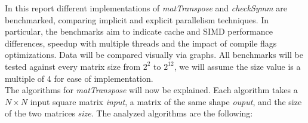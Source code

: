 \documentclass[conference]{IEEEtran}
\begin{document}

In this report different implementations of \textit{matTranspose}
and \textit{checkSymm} are benchmarked, comparing implicit and explicit parallelism
techniques. In particular, the benchmarks aim to indicate cache and SIMD performance differences,
speedup with multiple threads and the impact of compile flags optimizations. Data will be compared visually via graphs. All benchmarks
will be tested against every matrix size from $2^2$ to $2^{12}$, we will assume the size value is a multiple of 4 for ease of implementation.  \\
The algorithms for \textit{matTranspose} will now be explained.
Each algorithm takes a $N \times N$ input square matrix \textit{input}, a matrix of the same shape \textit{ouput}, and the size of the two matrices \textit{size}.
The analyzed algorithms are the following:
\end{document}
